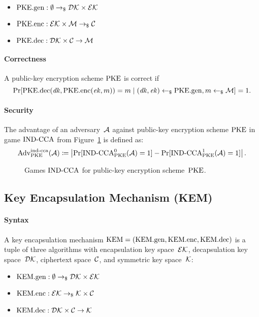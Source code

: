 \documentclass[a4paper,orivec]{llncs}
\begin{document}
\begin{itemize}
    \item $\mathrm{PKE}.\mathrm{gen}: \emptyset \to_\$ \mathcal{DK}\times\mathcal{EK}$
    \item $\mathrm{PKE}.\mathrm{enc}: \mathcal{EK}\times\mathcal{M} \to_\$ \mathcal{C}$
    \item $\mathrm{PKE}.\mathrm{dec}: \mathcal{DK}\times\mathcal{C} \to \mathcal{M}$
\end{itemize}

\paragraph{Correctness}
A public-key encryption scheme $\mathrm{PKE}$ is correct if
\[
\Pr[\mathrm{PKE}.\mathrm{dec}(\mathit{dk},\mathrm{PKE}.\mathrm{enc}(\mathit{ek},m))=m\mid (\mathit{dk},\mathit{ek})\gets_\$\mathrm{PKE}.\mathrm{gen},m\gets_\$\mathcal{M}]=1\text{.}
\]

\paragraph{Security}
The advantage of an adversary~$\mathcal{A}$ against public-key encryption scheme $\mathrm{PKE}$ in game ${\mathrm{IND}\text{-}\mathrm{CCA}}$ from Figure~\ref{fig:pke:ind} is defined as:
\[
\mathrm{Adv}_{\mathrm{PKE}}^{\mathrm{ind}\text{-}\mathrm{cca}}(\mathcal{A})\coloneqq\left|\Pr[{\mathrm{IND}\text{-}\mathrm{CCA}}_{\mathrm{PKE}}^0(\mathcal{A})=1]-\Pr[{\mathrm{IND}\text{-}\mathrm{CCA}}_{\mathrm{PKE}}^1(\mathcal{A})=1]\right|\text{.}
\]

\begin{figure}[!ht]
    \centering
    \nicoresetlinenr%
    \fbox{%
        \scalebox{\codescalefactor}{%
        }%
    }
    \caption{%
        Games ${\mathrm{IND}\text{-}\mathrm{CCA}}$ for public-key encryption scheme~$\mathrm{PKE}$.
    }
    \label{fig:pke:ind}
\end{figure}

\subsection{Key Encapsulation Mechanism (KEM)}

\paragraph{Syntax}
A key encapsulation mechanism $\mathrm{KEM}=(\mathrm{KEM}.\mathrm{gen},\mathrm{KEM}.\mathrm{enc},\mathrm{KEM}.\mathrm{dec})$ is a tuple of three algorithms with encapsulation key space~$\mathcal{EK}$, decapsulation key space~$\mathcal{DK}$, ciphertext space~$\mathcal{C}$, and symmetric key space~$\mathcal{K}$:

\begin{itemize}
    \item $\mathrm{KEM}.\mathrm{gen}: \emptyset \to_\$ \mathcal{DK}\times\mathcal{EK}$
    \item $\mathrm{KEM}.\mathrm{enc}: \mathcal{EK} \to_\$ \mathcal{K}\times\mathcal{C}$
    \item $\mathrm{KEM}.\mathrm{dec}: \mathcal{DK}\times\mathcal{C} \to \mathcal{K}$
\end{itemize}
\end{document}
